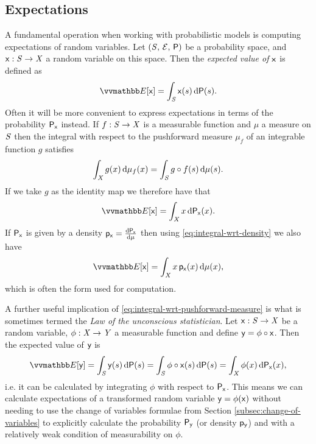 \subsection{Expectations}\label{subsec:expectations}

A fundamental operation when working with probabilistic models is computing expectations of random variables. Let $(\mathit{S},\,\mathcal{E},\,\mathsf{P})$ be a probability space, and $\mathsf{x} : \mathit{S} \to \mathit{X}$ a random variable on this space. Then the \emph{expected value of $\mathsf{x}$} is defined as
\begin{equation}\label{eq:expectation-general}
  \expc{\rvar{x}} = \int_{\set{S}} \rvar{x}(s) \,\dr\probability(s).
\end{equation}
Often it will be more convenient to express expectations in terms of the probability $\mathsf{P}_{\mathsf{x}}$ instead. If $f : \mathit{S} \to \mathit{X}$ is a measurable function and $\mu$ a measure on $\mathit{S}$ then the integral with respect to the pushforward measure $\mu_f$ of an integrable function $g$ satisfies
\begin{equation}\label{eq:integral-wrt-pushforward-measure}
  \int_{\mathit{X}} g(x) \,\mathrm{d}\mu_{f}(x) =
  \int_{\mathit{S}} g \circ f(s) \,\mathrm{d}\mu(s).
\end{equation}
If we take $g$ as the identity map we therefore have that
\begin{equation}\label{eq:expectation-pushfoward}
  \expc{\rvar{x}} = \int_{\set{X}} x \,\dr\prob{\rvar{x}}(x).
\end{equation}
If $\mathsf{P}_{\mathsf{x}}$ is given by a density $\mathsf{p}_{\mathsf{x}} = \frac{\mathrm{d} \mathsf{P}_{\mathsf{x}}}{\mathrm{d} \mu}$ then using \eqref{eq:integral-wrt-density} we also have
\begin{equation}\label{eq:expectation-density}
  \expc{\rvar{x}} = \int_{\set{X}} x \,\pden{\rvar{x}}(x) \,\dr\mu(x),
\end{equation}
which is often the form used for computation.

A further useful implication of \eqref{eq:integral-wrt-pushforward-measure} is what is sometimes termed the \emph{Law of the unconscious statistician}. Let $\mathsf{x} : \mathit{S} \to \mathit{X}$ be a random variable, $\phi : \mathit{X} \to \mathit{Y}$ a measurable function and define $\mathsf{y} = \phi \circ \mathsf{x}$. Then the expected value of $\mathsf{y}$ is
\begin{equation}\label{eq:law-of-the-unconscious-statistician}
  \expc{\rvar{y}} = \int_{\set{S}} \rvar{y}(s) \,\dr\probability(s)
  = \int_{\set{S}} \phi \circ \rvar{x}(s) \,\dr\probability(s)
  = \int_{\set{X}} \phi(x) \,\dr\prob{\rvar{x}}(x),
\end{equation}
i.e. it can be calculated by integrating $\phi$ with respect to $\mathsf{P}_{\mathsf{x}}$. This means we can calculate expectations of a transformed random variable $\mathsf{y} = \phi(\mathsf{x})$ without needing to use the change of variables formulae from Section \ref{subsec:change-of-variables} to explicitly calculate the probability $\mathsf{P}_{\mathsf{y}}$ (or density $\mathsf{p}_{\mathsf{y}}$) and with a relatively weak condition of measurability on $\phi$.

